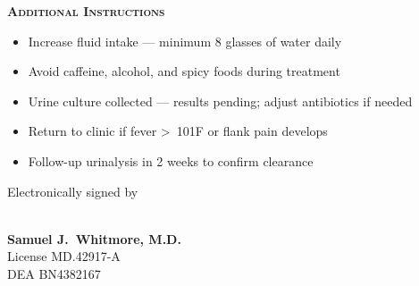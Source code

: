 \documentclass[12pt,letterpaper]{article}
\newcommand{\rxsection}[1]{%
  \vspace{2pt}%
  {\footnotesize\color{rxaccent}\textbf{\textsc{#1}}}\\[3pt]%
}
\begin{document}
\vspace{8pt}

\begin{minipage}[t]{0.58\linewidth}
\begin{tcolorbox}[colback=rxlight!20,colframe=rxblue,sharp corners,boxrule=1.2pt,left=14pt,right=14pt,top=12pt,bottom=12pt]
  \rxsection{Additional Instructions}
  \begin{itemize}[leftmargin=*,nosep,itemsep=3pt]
    \item[\color{rxaccent}\faCheckSquare] Increase fluid intake --- minimum 8 glasses of water daily
    \item[\color{rxaccent}\faCheckSquare] Avoid caffeine, alcohol, and spicy foods during treatment
    \item[\color{rxaccent}\faCheckSquare] Urine culture collected --- results pending; adjust antibiotics if needed
    \item[\color{rxaccent}\faCheckSquare] Return to clinic if fever \textgreater\ 101\textdegree F or flank pain develops
    \item[\color{rxaccent}\faCheckSquare] Follow-up urinalysis in 2 weeks to confirm clearance
  \end{itemize}
\end{tcolorbox}
\end{minipage}
\hfill
\begin{minipage}[t]{0.38\linewidth}
\begin{tcolorbox}[colback=white,colframe=rxblue,sharp corners,boxrule=1.2pt,left=14pt,right=14pt,top=12pt,bottom=12pt]
  \centering
  \vspace{6pt}
  {\small\color{rxgray}Electronically signed by}\\[4pt]
  \\[2pt]
  {\small\color{rxblue}\textbf{Samuel J.\ Whitmore, M.D.}}\\[2pt]
  {\footnotesize\color{rxgray}License MD.42917-A}\\[2pt]
  {\footnotesize\color{rxgray}DEA BN4382167}\\[6pt]
  \vspace{6pt}
\end{tcolorbox}
\end{minipage}
\end{document}
